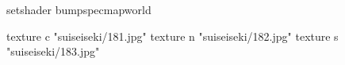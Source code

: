 setshader bumpspecmapworld

    texture c "suiseiseki/181.jpg"
    texture n "suiseiseki/182.jpg"
    texture s "suiseiseki/183.jpg"
